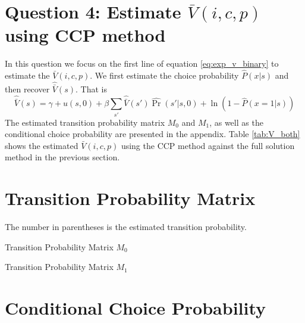 \documentclass[12pt]{article}[margin=1in]
\begin{document}
\section{Question 4: Estimate $\bar{V}(i,c,p)$ using CCP method}
In this question we focus on the first line of equation \ref{eq:exp_v_binary} to estimate the $\bar{V}(i,c,p)$. We first estimate the choice probability $\hat{P}(x|s)$ and then recover $\hat{\bar{V}}(s)$. That is
\begin{equation*}
    \hat{\bar{V}}(s) =  \gamma + u(s,0)+\beta \sum_{s'} \hat{\bar{V}}(s') \hat{\Pr}(s'|s,0)+\ln (1-\hat{P}(x=1|s))
\end{equation*}
The estimated transition probability matrix $M_0$ and $M_1$, as well as the conditional choice probability are presented in the appendix.
Table \ref{tab:V_both} shows the estimated $\bar{V}(i,c,p)$ using the CCP method against the full solution method in the previous section.
\begin{table} \fontsize{10pt}{12pt}\selectfont
    \centering
    
    \label{tab:V_both}
\end{table}

\pagebreak
\newpage
\appendix
\section{Transition Probability Matrix}
The number in parentheses is the estimated transition probability.
\begin{table}
    \centering
    
    \caption{Transition Probability Matrix $M_0$}
    \label{tab:M_0}
\end{table}
\begin{table}
    \centering
    
    \caption{Transition Probability Matrix $M_1$}
    \label{tab:M_1}
\end{table}
\section{Conditional Choice Probability}
\end{document}
